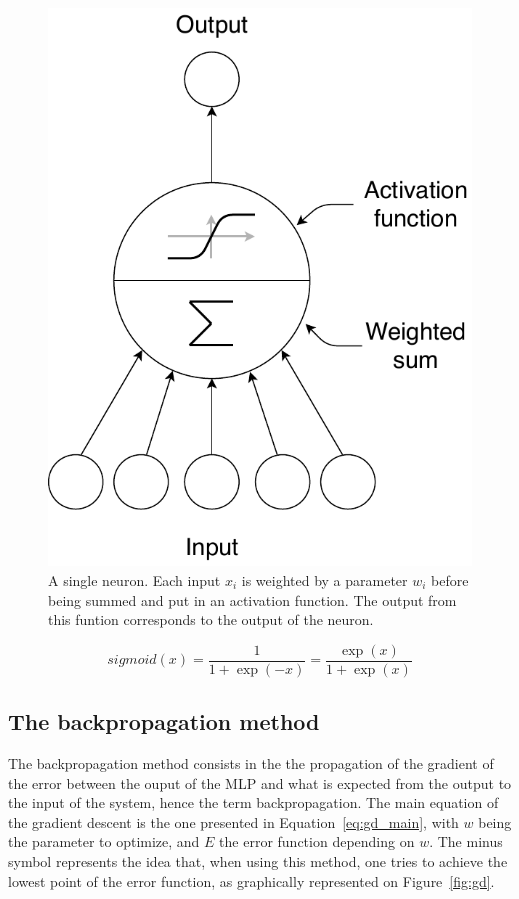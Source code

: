 \documentclass[a4paper]{report}
\begin{document}
    \begin{figure}[h]
        \centering
        \includegraphics[scale=.6]{perceptron}
        \caption{A single neuron. Each input $x_i$ is weighted by a parameter $w_i$ before being summed and put in an activation function. The output from this funtion corresponds to the output of the neuron.}
\label{fig:neuron}
    \end{figure}

    \begin{equation}
        sigmoid(x) = \frac{1}{1 + \exp(-x)} = \frac{\exp(x)}{1 + \exp(x)}
        \label{eq:sigmoid}
    \end{equation}

    \subsection{The backpropagation method}
    The backpropagation method consists in the the propagation of the gradient of the error between the ouput of the MLP and what is expected from the output to the input of the system, hence the term backpropagation. The main equation of the gradient descent is the one presented in Equation~\ref{eq:gd_main}, with $w$ being the parameter to optimize, and $E$ the error function depending on $w$. The minus symbol represents the idea that, when using this method, one tries to achieve the lowest point of the error function, as graphically represented on Figure~\ref{fig:gd}. 
\end{document}

